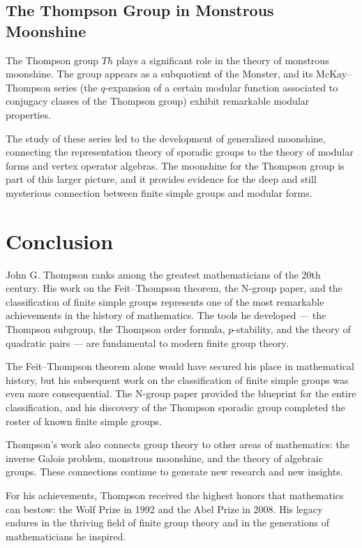 \subsection{The Thompson Group in Monstrous Moonshine}

The Thompson group \(Th\) plays a significant role in the theory of monstrous moonshine. The group appears as a subquotient of the Monster, and its McKay--Thompson series (the \(q\)-expansion of a certain modular function associated to conjugacy classes of the Thompson group) exhibit remarkable modular properties.

The study of these series led to the development of generalized moonshine, connecting the representation theory of sporadic groups to the theory of modular forms and vertex operator algebras. The moonshine for the Thompson group is part of this larger picture, and it provides evidence for the deep and still mysterious connection between finite simple groups and modular forms.

\section{Conclusion}

John G. Thompson ranks among the greatest mathematicians of the 20th century. His work on the Feit--Thompson theorem, the N-group paper, and the classification of finite simple groups represents one of the most remarkable achievements in the history of mathematics. The tools he developed --- the Thompson subgroup, the Thompson order formula, \(p\)-stability, and the theory of quadratic pairs --- are fundamental to modern finite group theory.

The Feit--Thompson theorem alone would have secured his place in mathematical history, but his subsequent work on the classification of finite simple groups was even more consequential. The N-group paper provided the blueprint for the entire classification, and his discovery of the Thompson sporadic group completed the roster of known finite simple groups.

Thompson's work also connects group theory to other areas of mathematics: the inverse Galois problem, monstrous moonshine, and the theory of algebraic groups. These connections continue to generate new research and new insights.

For his achievements, Thompson received the highest honors that mathematics can bestow: the Wolf Prize in 1992 and the Abel Prize in 2008. His legacy endures in the thriving field of finite group theory and in the generations of mathematicians he inspired.

